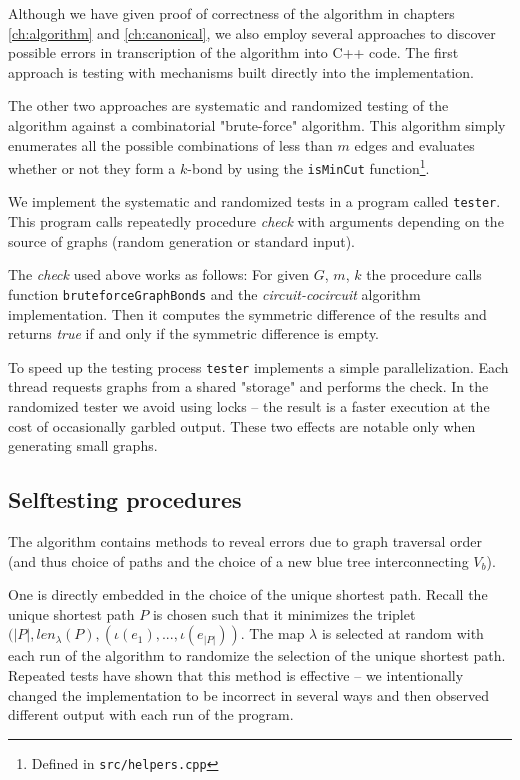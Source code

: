 Although we have given proof of correctness of the algorithm in chapters \ref{ch:algorithm} and \ref{ch:canonical}, we also employ several approaches to discover possible errors in transcription of the algorithm into C++ code. The first approach is testing with mechanisms built directly into the implementation.

The other two approaches are systematic and randomized testing of the algorithm against a combinatorial "brute-force" algorithm. This algorithm simply enumerates all the possible combinations of less than $m$ edges and evaluates whether or not they form a $k$-bond by using the \lstinline|isMinCut| function\footnote{Defined in \lstinline|src/helpers.cpp|}.

We implement the systematic and randomized tests in a program called \lstinline|tester|. This program calls repeatedly procedure \textit{check} with arguments depending on the source of graphs (random generation or standard input).

The \textit{check} used above works as follows: For given $G$, $m$, $k$ the procedure calls function \lstinline|bruteforceGraphBonds| and the \textit{circuit-cocircuit} algorithm implementation. Then it computes the symmetric difference of the results and returns \textit{true} if and only if the symmetric difference is empty.

To speed up the testing process \lstinline|tester| implements a simple parallelization. Each thread requests graphs from a shared "storage" and performs the check. In the randomized tester we avoid using locks -- the result is a faster execution at the cost of occasionally garbled output. These two effects are notable only when generating small graphs.


\subsection*{Selftesting procedures}

The algorithm contains methods to reveal errors due to graph traversal order (and thus choice of paths and the choice of a new blue tree interconnecting $V_b$).

One is directly embedded in the choice of the unique shortest path. Recall the unique shortest path $P$ is chosen such that it minimizes the triplet $(\lvert P \rvert, len_\lambda(P), (\iota(e_1), ...,\iota(e_{\lvert P \rvert}))$. The map $\lambda$ is selected at random with each run of the algorithm to randomize the selection of the unique shortest path. Repeated tests have shown that this method is effective -- we intentionally changed the implementation to be incorrect in several ways and then observed different output with each run of the program.

